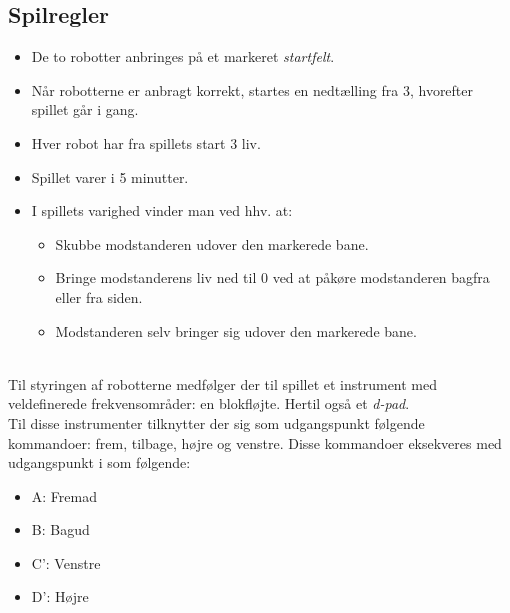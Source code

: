 \subsection{Spilregler}
\begin{itemize}
    \item De to robotter anbringes på et markeret \textit{startfelt}.
    \item Når robotterne er anbragt korrekt, startes en nedtælling fra 3, hvorefter spillet går i gang. 
    \item Hver robot har fra spillets start 3 liv.
    \item Spillet varer i 5 minutter.
    \item I spillets varighed vinder man ved hhv. at:
    \begin{itemize}
        \item Skubbe modstanderen udover den markerede bane.
        \item Bringe modstanderens liv ned til 0 ved at påkøre modstanderen bagfra eller fra siden.
        \item Modstanderen selv bringer sig udover den markerede bane. 
    \end{itemize}
\end{itemize}
\\\noindent
Til styringen af robotterne medfølger der til spillet et instrument med veldefinerede frekvensområder: en blokfløjte. Hertil også et \textit{d-pad}.
\\\noindent
\noindent Til disse instrumenter tilknytter der sig som udgangspunkt følgende kommandoer: frem, tilbage, højre og venstre. Disse kommandoer eksekveres med udgangspunkt i  som følgende: 
\begin{itemize}
    \item A: Fremad
    \item B: Bagud
    \item C': Venstre 
    \item D': Højre
\end{itemize}




